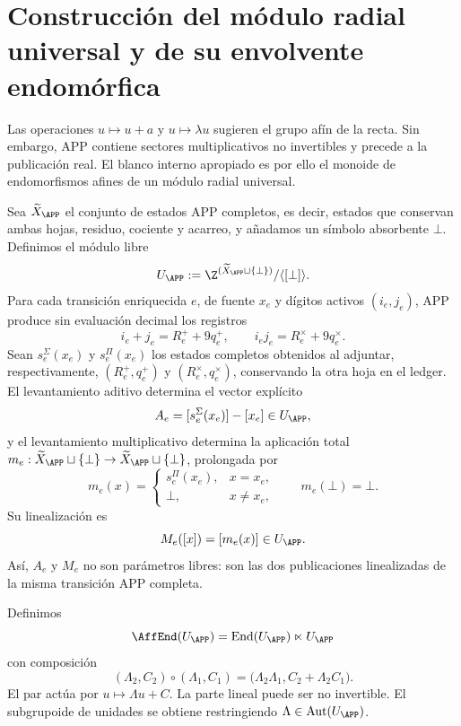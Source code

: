 \section{Construcción del módulo radial universal y de su envolvente endomórfica}

Las operaciones \(u\mapsto u+a\) y \(u\mapsto\lambda u\) sugieren el
grupo afín de la recta. Sin embargo, APP contiene sectores multiplicativos
no invertibles y precede a la publicación real. El blanco interno apropiado
es por ello el monoide de endomorfismos afines de un módulo radial universal.

Sea \(\widetilde X_{\APP}\) el conjunto de estados APP completos, es decir,
estados que conservan ambas hojas, residuo, cociente y acarreo, y añadamos un
símbolo absorbente \(\bot\). Definimos el módulo libre
\begin{equation}
 U_{\APP}:=\Z^{(\widetilde X_{\APP}\sqcup\{\bot\})}/\langle[\bot]\rangle.
 \label{espiral:eq:modulo-radial-universal}
\end{equation}
Para cada transición enriquecida \(e\), de fuente \(x_e\) y dígitos activos
\((i_e,j_e)\), APP produce sin evaluación decimal los registros
\[
 i_e+j_e=R_e^++9q_e^+,
 \qquad
 i_ej_e=R_e^\times+9q_e^\times.
\]
Sean \(s_e^\Sigma(x_e)\) y \(s_e^\Pi(x_e)\) los estados completos obtenidos
al adjuntar, respectivamente, \((R_e^+,q_e^+)\) y
\((R_e^\times,q_e^\times)\), conservando la otra hoja en el ledger. El
levantamiento aditivo determina el vector explícito
\[
 A_e=[s_e^\Sigma(x_e)]-[x_e]\in U_{\APP},
\]
y el levantamiento multiplicativo determina la aplicación total
\(m_e:\widetilde X_{\APP}\sqcup\{\bot\}\to
\widetilde X_{\APP}\sqcup\{\bot\}\), prolongada por
\[
 m_e(x)=
 \begin{cases}
 s_e^\Pi(x_e),&x=x_e,\\
 \bot,&x\neq x_e,
 \end{cases}
 \qquad m_e(\bot)=\bot.
\]
Su linealización es
\[
 M_e([x])=[m_e(x)]\in U_{\APP}.
\]
Así, \(A_e\) y \(M_e\) no son parámetros libres: son las dos publicaciones
linealizadas de la misma transición APP completa.

Definimos
\[
 \AffEnd(U_{\APP})
 =\operatorname{End}(U_{\APP})\ltimes U_{\APP}
\]
con composición
\begin{equation}
 (\Lambda_2,C_2)\circ(\Lambda_1,C_1)
 =\bigl(\Lambda_2\Lambda_1,
 C_2+\Lambda_2C_1\bigr).
 \label{espiral:eq:producto-affend}
\end{equation}
El par actúa por \(u\mapsto\Lambda u+C\). La parte lineal puede ser no
invertible. El subgrupoide de unidades se obtiene restringiendo
\(\Lambda\in\operatorname{Aut}(U_{\APP})\).

